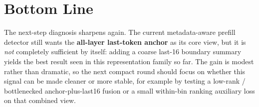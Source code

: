 \documentclass[11pt]{article}
\begin{document}
\section*{Bottom Line}
The next-step diagnosis sharpens again. The current metadata-aware prefill detector still wants the \textbf{all-layer last-token anchor} as its core view, but it is \emph{not} completely sufficient by itself: adding a coarse last-16 boundary summary yields the best result seen in this representation family so far. The gain is modest rather than dramatic, so the next compact round should focus on whether this signal can be made cleaner or more stable, for example by testing a low-rank / bottlenecked anchor-plus-last16 fusion or a small within-bin ranking auxiliary loss on that combined view.
\end{document}
